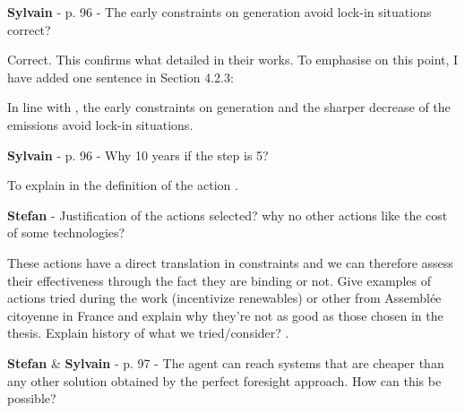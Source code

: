 \documentclass[12pt,a4paper]{article}
\begin{document}
\begin{mdframed}[style=comment] %
{\color{purple} \textbf{Sylvain}} - p. 96 - The early constraints on generation avoid lock-in situations correct?
\end{mdframed}

\noindent Correct. This confirms what \citet{vogt2018starting} detailed in their works. To emphasise on this point, I have added one sentence {\color{blue}in Section 4.2.3}:

\begin{mdframed}[style=manuscript] %
In line with \citet{vogt2018starting}, the early constraints on generation and the sharper decrease of the emissions avoid lock-in situations.
\end{mdframed}

\begin{mdframed}[style=comment] %
{\color{purple} \textbf{Sylvain}} - p. 96 - Why 10 years if the step is 5?
\end{mdframed}

\noindent To explain in the definition of the action {\color{blue} }. 

\begin{mdframed}[style=manuscript] %

\end{mdframed}

\begin{mdframed}[style=comment] %
{\color{teal} \textbf{Stefan}} - Justification of the actions selected? why no other actions like the cost of some technologies? 
\end{mdframed}

\noindent These actions have a direct translation in constraints and we can therefore assess their effectiveness through the fact they are binding or not. Give examples of actions tried during the work (incentivize renewables) or other from Assemblée citoyenne in France and explain why they’re not as good as those chosen in the thesis. Explain history of what we tried/consider? 
 {\color{blue} }.

\begin{mdframed}[style=manuscript] %

\end{mdframed}

\begin{mdframed}[style=comment] %
{\color{teal} \textbf{Stefan}} \& {\color{purple} \textbf{Sylvain}} - p. 97 - The agent can reach systems that are cheaper than any other solution obtained by the perfect foresight approach. How can this be possible?
\end{mdframed}
\end{document}
